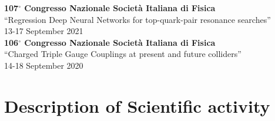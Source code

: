 \documentclass[10pt]{article} %
\begin{document}
\textbf{107$^{\circ}$ Congresso Nazionale Società Italiana di Fisica} \\
``Regression Deep Neural Networks for top-quark-pair resonance searches'' \\
13-17 September 2021  \\

\textbf{106$^{\circ}$ Congresso Nazionale Società Italiana di Fisica} \\ 
``Charged Triple Gauge Couplings at present and future colliders'' \\
14-18 September 2020  \\



\section{Description of Scientific activity}
\end{document}
